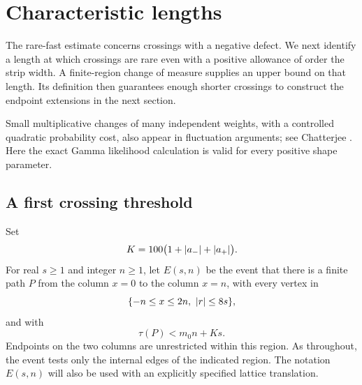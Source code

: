 \section{Characteristic lengths}\label{df:sec:scales}

The rare-fast estimate concerns crossings with a negative defect.
We next identify a length at which crossings are rare even with a
positive allowance of order the strip width. A finite-region change
of measure supplies an upper bound on that length. Its definition
then guarantees enough shorter crossings to construct the endpoint
extensions in the next section.

Small multiplicative changes of many independent weights, with a
controlled quadratic probability cost, also appear in fluctuation
arguments; see Chatterjee \cite{Chatterjee2019}. Here the exact Gamma
likelihood calculation is valid for every positive shape parameter.

\subsection{A first crossing threshold}

Set
\[
 K=100\bigl(1+\left\lvert a_-\right\rvert+\left\lvert a_+\right\rvert\bigr).
\]
For real $s\geq1$ and integer $n\geq1$, let $E(s,n)$ be the event that
there is a finite path $P$ from the column $x=0$ to the column $x=n$,
with every vertex in
\[
 \{-n\leq x\leq2n,\ \abs{r}\leq8s\},
\]
and with
\[
 \tau(P)<m_0n+Ks.
\]
Endpoints on the two columns are unrestricted within this region. As
throughout, the event tests only the internal edges of the indicated
region. The notation $E(s,n)$ will also be used with an explicitly
specified lattice translation.

